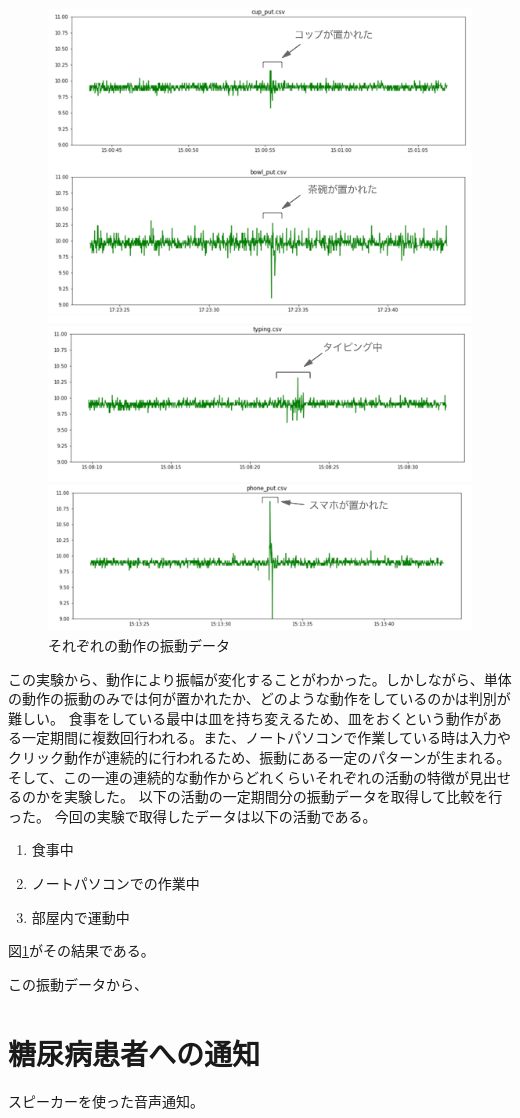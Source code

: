 \begin{figure}[htbp]
  \caption{それぞれの動作の振動データ}
  \label{fig:actions_vibration}
  \begin{center}
    \includegraphics[bb=0 0 700 800,width=20cm]{assets/actions_vibration.png}
  \end{center}
\end{figure}

この実験から、動作により振幅が変化することがわかった。しかしながら、単体の動作の振動のみでは何が置かれたか、どのような動作をしているのかは判別が難しい。
食事をしている最中は皿を持ち変えるため、皿をおくという動作がある一定期間に複数回行われる。また、ノートパソコンで作業している時は入力やクリック動作が連続的に行われるため、振動にある一定のパターンが生まれる。
そして、この一連の連続的な動作からどれくらいそれぞれの活動の特徴が見出せるのかを実験した。
以下の活動の一定期間分の振動データを取得して比較を行った。
今回の実験で取得したデータは以下の活動である。

\begin{enumerate}
  \item 食事中
  \item ノートパソコンでの作業中
  \item 部屋内で運動中
\end{enumerate}

図\ref{}がその結果である。

この振動データから、

\section{糖尿病患者への通知}

スピーカーを使った音声通知。
